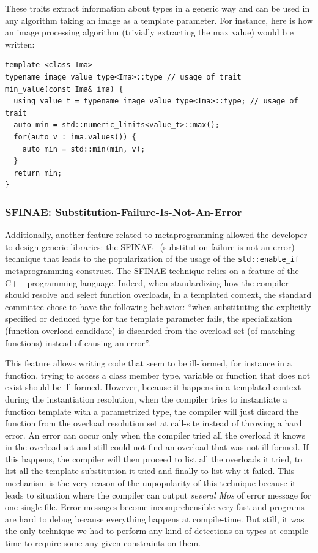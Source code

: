 These traits extract information about types in a generic way and can be used in any algorithm taking an image as a
template parameter. For instance, here is how an image processing algorithm (trivially extracting the max value) would b
e written:

\begin{verbatim}
template <class Ima>
typename image_value_type<Ima>::type // usage of trait
min_value(const Ima& ima) {
  using value_t = typename image_value_type<Ima>::type; // usage of trait
  auto min = std::numeric_limits<value_t>::max();
  for(auto v : ima.values()) {
    auto min = std::min(min, v);
  }
  return min;
}
\end{verbatim}

\subsubsection{SFINAE: Substitution-Failure-Is-Not-An-Error}
\label{subsec:sfinae}

Additionally, another feature related to metaprogramming  allowed the developer to design generic libraries: the
SFINAE~\parencite{vandevoorde.2002.c++} (substitution-failure-is-not-an-error) technique that leads to the
popularization of the usage of the \texttt{std::enable\_if} metaprogramming construct. The SFINAE technique relies on a
feature of the C++ programming language. Indeed, when standardizing how the compiler should resolve and select function
overloads, in a templated context, the standard committee chose to have the following behavior: ``when substituting the
explicitly specified or deduced type for the template parameter fails, the specialization (function overload candidate)
is discarded from the overload set (of matching functions) instead of causing an error''.

This feature allows writing code that seem to be ill-formed, for instance in a function, trying to access a class member
type, variable or function that does not exist should be ill-formed. However, because it happens in a templated context
during the instantiation resolution, when the compiler tries to instantiate a function template with a parametrized
type, the compiler will just discard the function from the overload resolution set at call-site instead of throwing a
hard error. An error can occur only when the compiler tried all the overload it knows in the overload set and still
could not find an overload that was not ill-formed. If this happens, the compiler will then proceed to list all the
overloads it tried, to list all the template substitution it tried and finally to list why it failed. This mechanism is
the very reason of the unpopularity of this technique because it leads to situation where the compiler can output
\emph{several Mos} of error message for one single file. Error messages become incomprehensible very fast and programs
are hard to debug because everything happens at compile-time. But still, it was the only technique we had to perform any
kind of detections on types at compile time to require some any given constraints on them.

